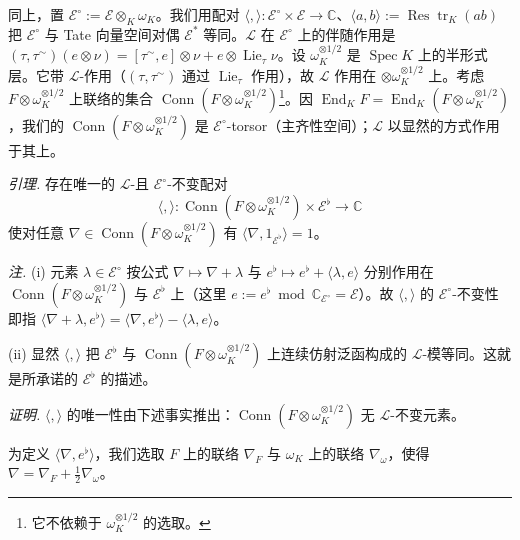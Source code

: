 同上，置 $\mathcal{E}^{\circ}:=\mathcal{E}\otimes_{K}\omega_{K}$。我们用配对 $\langle,\rangle:\mathcal{E}^{\circ}\times\mathcal{E}\to\mathbb{C}$、$\langle a,b\rangle:=\operatorname{Res}\operatorname{tr}_{K}(ab)$ 把 $\mathcal{E}^{\circ}$ 与 Tate 向量空间对偶 $\mathcal{E}^{*}$ 等同。$\mathcal{L}$ 在 $\mathcal{E}^{\circ}$ 上的伴随作用是 $(\tau,\tau^{\sim})(e\otimes\nu)=[\tau^{\sim},e]\otimes\nu+e\otimes\operatorname{Lie}_{\tau}\nu$。设 $\omega_{K}^{\otimes1/2}$ 是 $\operatorname{Spec}K$ 上的半形式层。它带 $\mathcal{L}$-作用（$(\tau,\tau^{\sim})$ 通过 $\operatorname{Lie}_{\tau}$ 作用），故 $\mathcal{L}$ 作用在 $\otimes\omega_{K}^{\otimes1/2}$ 上。考虑 $F\otimes\omega_{K}^{\otimes1/2}$ 上联络的集合 $\operatorname{Conn}(F\otimes\omega_{K}^{\otimes1/2})$\footnote{它不依赖于 $\omega_{K}^{\otimes1/2}$ 的选取。}。因 $\operatorname{End}_{K}F=\operatorname{End}_{K}(F\otimes\omega_{K}^{\otimes1/2})$，我们的 $\operatorname{Conn}(F\otimes\omega_{K}^{\otimes1/2})$ 是 $\mathcal{E}^{\circ}$-torsor（主齐性空间）；$\mathcal{L}$ 以显然的方式作用于其上。

 \emph{引理.} 存在唯一的 $\mathcal{L}$-且 $\mathcal{E}^{\circ}$-不变配对
\[
\langle,\rangle:\operatorname{Conn}(F\otimes\omega_{K}^{\otimes1/2})\times\mathcal{E}^{\flat}\to\mathbb{C}
\]
使对任意 $\nabla\in\operatorname{Conn}(F\otimes\omega_{K}^{\otimes1/2})$ 有 $\langle\nabla,1_{\mathcal{E}^{\flat}}\rangle=1$。

\emph{注.} (i) 元素 $\lambda\in\mathcal{E}^{\circ}$ 按公式 $\nabla\mapsto\nabla+\lambda$ 与 $e^{\flat}\mapsto e^{\flat}+\langle\lambda,e\rangle$ 分别作用在 $\operatorname{Conn}(F\otimes\omega_{K}^{\otimes1/2})$ 与 $\mathcal{E}^{\flat}$ 上（这里 $e:=e^{\flat}\bmod\mathbb{C}_{\mathcal{E}^{\circ}}=\mathcal{E}$）。故 $\langle,\rangle$ 的 $\mathcal{E}^{\circ}$-不变性即指 $\langle\nabla+\lambda,e^{\flat}\rangle=\langle\nabla,e^{\flat}\rangle-\langle\lambda,e\rangle$。

(ii) 显然 $\langle,\rangle$ 把 $\mathcal{E}^{\flat}$ 与 $\operatorname{Conn}(F\otimes\omega_{K}^{\otimes1/2})$ 上连续仿射泛函构成的 $\mathcal{L}$-模等同。这就是所承诺的 $\mathcal{E}^{\flat}$ 的描述。


\emph{证明.} $\langle,\rangle$ 的唯一性由下述事实推出：$\operatorname{Conn}(F\otimes\omega_{K}^{\otimes1/2})$ 无 $\mathcal{L}$-不变元素。

为定义 $\langle\nabla,e^{\flat}\rangle$，我们选取 $F$ 上的联络 $\nabla_{F}$ 与 $\omega_{K}$ 上的联络 $\nabla_{\omega}$，使得 $\nabla=\nabla_{F}+\frac{1}{2}\nabla_{\omega}$。

